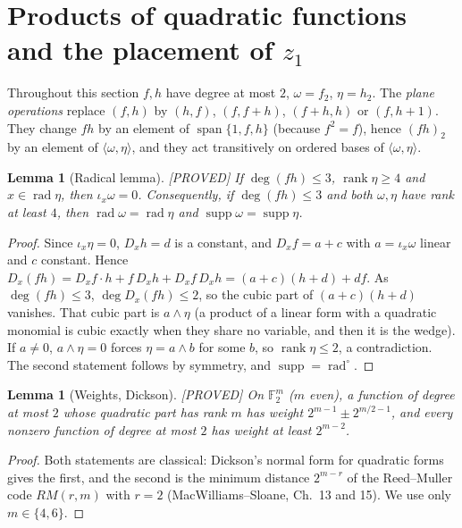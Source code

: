 \documentclass[11pt,a4paper]{article}
\theoremstyle{plain}
\newtheorem{lemma}[theorem]{Lemma}
\theoremstyle{definition}
\theoremstyle{remark}
\newcommand{\F}{\mathbb{F}_2}
\newcommand{\Span}{\operatorname{span}}
\newcommand{\supp}{\operatorname{supp}}
\newcommand{\rad}{\operatorname{rad}}
\newcommand{\rk}{\operatorname{rank}}
\newcommand{\status}[1]{\hfill\textsf{[#1]}}
\begin{document}
\section{Products of quadratic functions and the placement of $z_1$}

Throughout this section $f,h$ have degree at most $2$, $\omega=f_2$, $\eta=h_2$. The \emph{plane operations} replace $(f,h)$ by $(h,f)$, $(f,f+h)$, $(f+h,h)$ or $(f,h+1)$. They change $fh$ by an element of $\Span\{1,f,h\}$ (because $f^2=f$), hence $(fh)_2$ by an element of $\langle\omega,\eta\rangle$, and they act transitively on ordered bases of $\langle\omega,\eta\rangle$.

\begin{lemma}[Radical lemma]\label{lem:rad}\status{PROVED}
If $\deg(fh)\le3$, $\rk\eta\ge4$ and $x\in\rad\eta$, then $\iota_x\omega=0$. Consequently, if $\deg(fh)\le 3$ and both $\omega,\eta$ have rank at least $4$, then $\rad\omega=\rad\eta$ and $\supp\omega=\supp\eta$.
\end{lemma}

\begin{proof}
Since $\iota_x\eta=0$, $D_xh=d$ is a constant, and $D_xf=a+c$ with $a=\iota_x\omega$ linear and $c$ constant. Hence $D_x(fh)=D_xf\cdot h+f\,D_xh+D_xf\,D_xh=(a+c)(h+d)+d f$. As $\deg(fh)\le3$, $\deg D_x(fh)\le2$, so the cubic part of $(a+c)(h+d)$ vanishes. That cubic part is $a\wedge\eta$ (a product of a linear form with a quadratic monomial is cubic exactly when they share no variable, and then it is the wedge). If $a\ne0$, $a\wedge\eta=0$ forces $\eta=a\wedge b$ for some $b$, so $\rk\eta\le2$, a contradiction. The second statement follows by symmetry, and $\supp=\rad^{\circ}$.
\end{proof}

\begin{lemma}[Weights, Dickson]\label{lem:wt}\status{PROVED}
On $\F^m$ ($m$ even), a function of degree at most $2$ whose quadratic part has rank $m$ has weight $2^{m-1}\pm2^{m/2-1}$, and every nonzero function of degree at most $2$ has weight at least $2^{m-2}$.
\end{lemma}

\begin{proof}
Both statements are classical: Dickson's normal form for quadratic forms gives the first, and the second is the minimum distance $2^{m-r}$ of the Reed--Muller code $RM(r,m)$ with $r=2$ (MacWilliams--Sloane, Ch.~13 and 15). We use only $m\in\{4,6\}$.
\end{proof}
\end{document}
